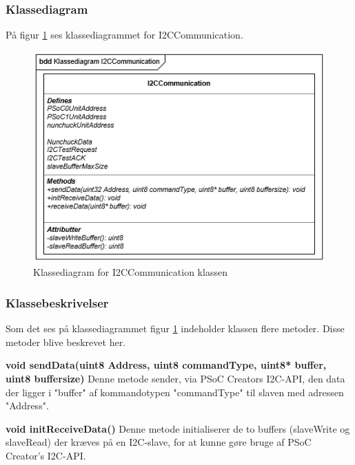 \subsubsection{Klassediagram}
På figur \ref{figure:klassediagramI2CCommunication} ses klassediagrammet for I2CCommunication. 
\begin{figure}[H]
	\centering
	\includegraphics[]{DesignOgImplementering/images/I2CCommunication}
	\caption{Klassediagram for I2CCommunication klassen}
	\label{figure:klassediagramI2CCommunication}
\end{figure}

\subsubsection{Klassebeskrivelser}
Som det ses på klassediagrammet figur \ref{figure:klassediagramI2CCommunication} indeholder klassen flere metoder. Disse metoder blive beskrevet her.\newline

\noindent\textbf{void sendData(uint8 Address, uint8 commandType, uint8* buffer, uint8 buffersize)}\newline
Denne metode sender, via PSoC Creators I2C-API, den data der ligger i "buffer" af kommandotypen "commandType" til slaven med adressen "Address". \newline

\noindent\textbf{void initReceiveData()} \newline 
Denne metode initialiserer de to buffers (slaveWrite og slaveRead) der kræves på en I2C-slave, for at kunne gøre bruge af PSoC Creator's I2C-API. \newline

